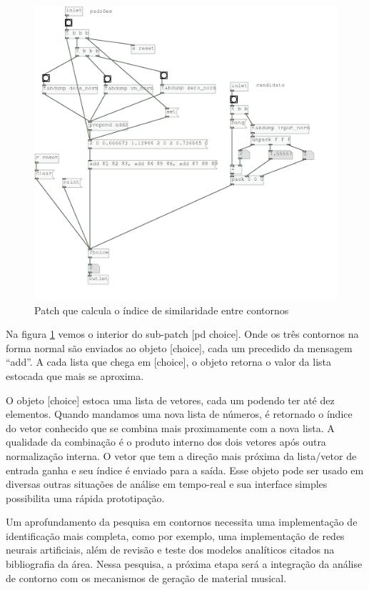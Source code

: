 \documentclass{ppgmus}
\begin{document}
\begin{figure}
\includegraphics[scale=.5]{similaridade-algo}
\caption{Patch que calcula o índice de similaridade entre contornos}
\label{similaridade-algo}
\end{figure}


Na figura \ref{similaridade-algo} vemos o interior do sub-patch [pd choice].
Onde os três contornos na forma normal são enviados ao objeto [choice], cada um
precedido da mensagem ``add''. A cada lista que chega em [choice], o objeto retorna
o valor da lista estocada que mais se aproxima.

O objeto [choice] estoca uma lista de vetores, cada um podendo ter até dez
elementos. Quando mandamos uma nova lista de números, é retornado o índice
do vetor conhecido que se combina mais proximamente com a nova lista. A qualidade
da combinação  é o produto interno dos dois vetores após outra normalização
interna. O vetor que tem a direção mais próxima da lista/vetor de entrada ganha e seu
índice é enviado para a saída. Esse objeto pode ser usado em diversas outras situações
de análise em tempo-real e sua interface simples possibilita uma rápida prototipação.

Um aprofundamento da pesquisa em contornos necessita uma implementação de identificação
mais completa, como por exemplo, uma implementação de redes neurais artificiais, além
de revisão e teste dos modelos analíticos citados na bibliografia da área.
Nessa pesquisa, a próxima etapa será a integração da análise de contorno com os
mecanismos de geração de material musical.
\end{document}
